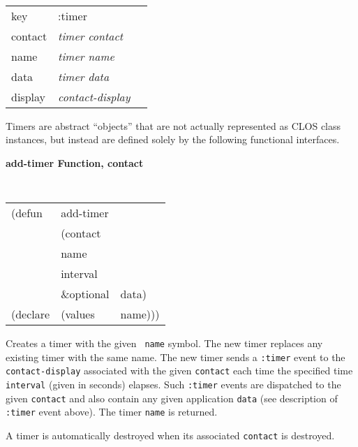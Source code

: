 \documentclass[twoside]{book}
\begin{document}
\begin{sloppy}
\begin{center} 
\tt
\begin{tabular}{lll}
key       & :timer\\
contact   & {\em timer contact}\\
name      & {\em timer name}\\
data      & {\em timer data}\\
display      & {\em contact-display}
\end{tabular}
\rm
\end{center}

Timers are abstract ``objects'' that are not actually represented as CLOS class
instances, but instead are defined solely by the following functional
interfaces.

{\samepage
{\large {\bf add-timer \hfill Function, contact}} 
\begin{flushright} \parbox[t]{6.125in}{
\tt
\begin{tabular}{lll}
\raggedright
(defun & add-timer & \\ 
& (contact\\ 
& name\\
& interval\\
& \&optional & data)\\
(declare & (values  & name)))
\end{tabular}
\rm

}\end{flushright}
}

\begin{flushright} \parbox[t]{6.125in}{ Creates a timer with the given {\tt
name} symbol. The new timer replaces any existing timer with the same name. The
new timer sends a {\tt :timer} event to the {\tt contact-display}
associated with the given {\tt contact} each time the specified time {\tt
interval} (given in seconds) elapses\footnotemark. Such {\tt :timer} events 
are dispatched to the given {\tt contact} and also contain any given application
{\tt data} (see description of {\tt :timer} event above). The timer {\tt name} is
returned.

A timer is automatically destroyed when its associated {\tt contact} is
destroyed.

}\end{flushright}


\end{sloppy}
\end{document}
